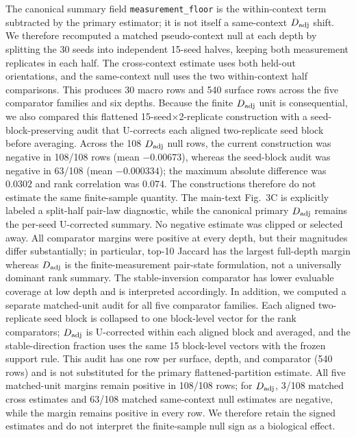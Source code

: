 \documentclass{article}
\begin{document}
The canonical summary field \texttt{measurement\_floor} is the within-context
term subtracted by the primary estimator; it is not itself a same-context
$D_{\rm adj}$ shift. We therefore recomputed a matched pseudo-context null at
each depth by splitting the 30 seeds into independent 15-seed halves, keeping
both measurement replicates in each half. The cross-context estimate uses both
held-out orientations, and the same-context null uses the two within-context
half comparisons. This produces 30 macro rows and 540 surface rows across the
five comparator families and six depths. Because the finite $D_{\rm adj}$ unit
is consequential, we also compared this flattened 15-seed$\times$2-replicate
construction with a seed-block-preserving audit that U-corrects each aligned
two-replicate seed block before averaging. Across the 108 $D_{\rm adj}$ null
rows, the current construction was negative in 108/108 rows (mean $-0.00673$),
whereas the seed-block audit was negative in 63/108 (mean $-0.000334$); the
maximum absolute difference was $0.0302$ and rank correlation was $0.074$.
The constructions therefore do not estimate the same finite-sample quantity.
The main-text Fig.~3C is explicitly labeled a split-half pair-law
diagnostic, while the canonical primary $D_{\rm adj}$ remains the per-seed
U-corrected summary. No negative estimate was clipped or selected away.
All comparator margins were positive
at every depth, but their magnitudes differ substantially; in particular,
top-10 Jaccard has the largest full-depth margin whereas $D_{\rm adj}$ is the
finite-measurement pair-state formulation, not a universally dominant rank
summary. The stable-inversion comparator has lower evaluable coverage at low
depth and is interpreted accordingly. In addition, we computed a separate
matched-unit audit for all five comparator families. Each aligned
two-replicate seed block is collapsed to one block-level vector for the rank
comparators; $D_{\rm adj}$ is U-corrected within each aligned block and
averaged, and the stable-direction fraction uses the same 15 block-level
vectors with the frozen support rule. This audit has one row per surface,
depth, and comparator (540 rows) and is not substituted for the primary
flattened-partition estimate. All five matched-unit margins remain positive
in 108/108 rows; for $D_{\rm adj}$, 3/108 matched cross estimates and 63/108
matched same-context null estimates are negative, while the margin remains
positive in every row. We therefore retain the signed estimates and do not
interpret the finite-sample null sign as a biological effect.
\end{document}

